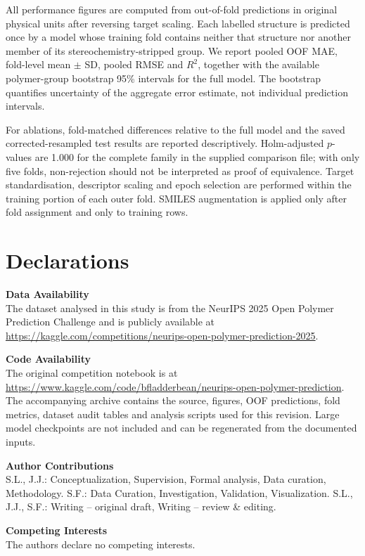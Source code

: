 \documentclass{article}
\begin{document}
All performance figures are computed from out-of-fold predictions in original physical units after reversing target scaling. Each labelled structure is predicted once by a model whose training fold contains neither that structure nor another member of its stereochemistry-stripped group. We report pooled OOF MAE, fold-level mean $\pm$ SD, pooled RMSE and $R^2$, together with the available polymer-group bootstrap 95\% intervals for the full model. The bootstrap quantifies uncertainty of the aggregate error estimate, not individual prediction intervals.

For ablations, fold-matched differences relative to the full model and the saved corrected-resampled test results are reported descriptively. Holm-adjusted $p$-values are 1.000 for the complete family in the supplied comparison file; with only five folds, non-rejection should not be interpreted as proof of equivalence. Target standardisation, descriptor scaling and epoch selection are performed within the training portion of each outer fold. SMILES augmentation is applied only after fold assignment and only to training rows.

\section*{Declarations}

\textbf{Data Availability} \\
The dataset analysed in this study is from the NeurIPS 2025 Open Polymer Prediction Challenge and is publicly available at \url{https://kaggle.com/competitions/neurips-open-polymer-prediction-2025}.

\textbf{Code Availability} \\
The original competition notebook is at \url{https://www.kaggle.com/code/bfladderbean/neurips-open-polymer-prediction}. The accompanying archive contains the source, figures, OOF predictions, fold metrics, dataset audit tables and analysis scripts used for this revision. Large model checkpoints are not included and can be regenerated from the documented inputs.

\textbf{Author Contributions} \\
S.L., J.J.: Conceptualization, Supervision, Formal analysis, Data curation, Methodology. S.F.: Data Curation, Investigation, Validation, Visualization. S.L., J.J., S.F.: Writing -- original draft, Writing -- review \& editing.

\textbf{Competing Interests} \\
The authors declare no competing interests.
\end{document}
